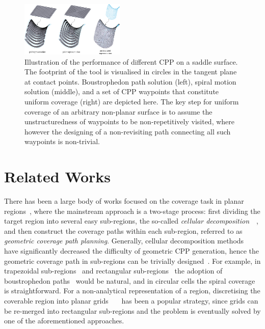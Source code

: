 \documentclass[lettersize,journal]{IEEEtran}
\begin{document}
\begin{figure}[t]
\centering
\includegraphics[width=0.44\textwidth]{figures/new_fig2/fig2_smaller}
\caption{
Illustration of the performance of different CPP on a saddle surface. 
The footprint of the tool is visualised in circles in the tangent plane at contact points. 
Boustrophedon path solution (left), spiral motion solution (middle), and a set of CPP waypoints that constitute uniform coverage (right) are depicted here. 
The key step for uniform coverage of an arbitrary non-planar surface is to assume the unstructuredness of waypoints to be non-repetitively visited, where however the designing of a non-revisiting path connecting all such waypoints is non-trivial. 
}\label{fig:saddle}
\end{figure}



\section{Related Works}\label{section_related_works}
There has been a large body of works focused on the coverage task in planar regions~\cite{Wong2003Topological}, where the mainstream approach is a two-stage process: first dividing the target region into several easy sub-regions, the so-called \textit{cellular decomposition}~\cite{Acar2002Morse}~\cite{Ramesh2021Optimal}, and then construct the coverage paths within each sub-region, referred to as \textit{geometric coverage path planning}. 
Generally, cellular decomposition methods~\cite{Mannadiar2010Optimal}~\cite{Brown2016Constriction} have significantly decreased the difficulty of geometric CPP generation, hence the geometric coverage path in sub-regions can be trivially designed~\cite{Bormann2018Indoor}. 
For example, in trapezoidal sub-regions~\cite{Latombe2012Robot} and rectangular sub-regions~\cite{Gabriely2002Spiral} the adoption of boustrophedon paths~\cite{Choset2000Coverage} would be natural, and in circular cells the spiral coverage is straightforward. 
For a non-analytical representation of a region, discretising the coverable region into planar grids~\cite{Gabriely2002Spiral}~\cite{Gonzalez2005Bsa}~\cite{Vselek2018Mobile} has been a popular strategy, since grids can be re-merged into rectangular sub-regions and the problem is eventually solved by one of the aforementioned approaches. 
\end{document}
